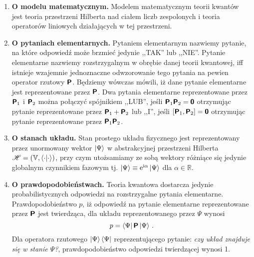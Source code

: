 \documentclass{myclass}
\begin{document}
\begin{enumerate}[label=\Roman*.]
    
    \item \textbf{O modelu matematycznym.} Modelem matematycznym teorii kwantów jest teoria
    przestrzeni Hilberta nad ciałem liczb zespolonych i teoria operatorów liniowych działających w
    tej przestrzeni.

    \item \textbf{O pytaniach elementarnych.} Pytaniem elementarnym nazwiemy pytanie, na które
    odpowiedź może brzmieć jedynie ,,TAK'' lub ,,NIE''. Pytanie elementarne nazwiemy rozstrzygalnym
    w obrębie danej teorii kwantowej, iff istnieje wzajemnie jednoznaczne odwzorowanie tego pytania
    na pewien operator rzutowy \(\boldsymbol{\mathsf{P}}\). Będziemy wówczas mówili, iż dane pytanie elementarne
    jest reprezentowane przez \(\boldsymbol{\mathsf{P}}\). Dwa pytania elementarne reprezentowane przez
    \(\boldsymbol{\mathsf{P}}_1\) i \(\boldsymbol{\mathsf{P}}_2\) można połączyć spójnikiem ,,LUB'', jeśli \(\boldsymbol{\mathsf{P}}_1\boldsymbol{\mathsf{P}}_2
    = \boldsymbol{\mathsf{\mathsf{0}}}\) otrzymując pytanie reprezentowane przez \(\boldsymbol{\mathsf{P}}_1 + \boldsymbol{\mathsf{P}}_2\) lub
    ,,I'', jeśli \([\boldsymbol{\mathsf{P}}_1, \boldsymbol{\mathsf{P}}_2] = \boldsymbol{\mathsf{\mathsf{0}}}\) otrzymując pytanie reprezentowane
    przez \(\boldsymbol{\mathsf{P}}_1\boldsymbol{\mathsf{P}}_2\).

    \item \textbf{O stanach układu.} Stan prostego układu fizycznego jest reprezentowany przez
    unormowany wektor \(\ket{\Psi}\) w abstrakcyjnej przestrzeni Hilberta \(\mathscr{H} =
    (\mathbb{V}, \braket{\cdot})\), przy czym utożsamiamy ze sobą wektory różniące się jedynie
    globalnym czynnikiem fazowym tj. \(\ket{\Psi} \equiv \mathrm{e}^{\mathrm{i}\alpha}\ket{\Psi}\) dla \(\alpha \in
    \mathbb{R}\).

    \item \textbf{O prawdopodobieństwach.} Teoria kwantowa dostarcza jedynie probabilistycznych
    odpowiedzi na rozstrzygalne pytania elementarne. Prawdopodobieństwo \(p\), iż odpowiedź na
    pytanie elementarne reprezentowane przez \(\boldsymbol{\mathsf{P}}\) jest twierdząca, dla układu
    reprezentowanego przez \(\Psi\) wynosi
    \begin{equation*}
        p = \bra{\Psi}\boldsymbol{\mathsf{P}}\ket{\Psi}\,.
    \end{equation*}
    Dla operatora rzutowego \(\ket{\Psi}\bra{\Psi}\) reprezentującego pytanie: \textit{czy układ
    znajduje się w stanie \(\Psi\)?}, prawdopodobieństwo odpowiedzi twierdzącej wynosi 1.


\end{enumerate}
\end{document}
